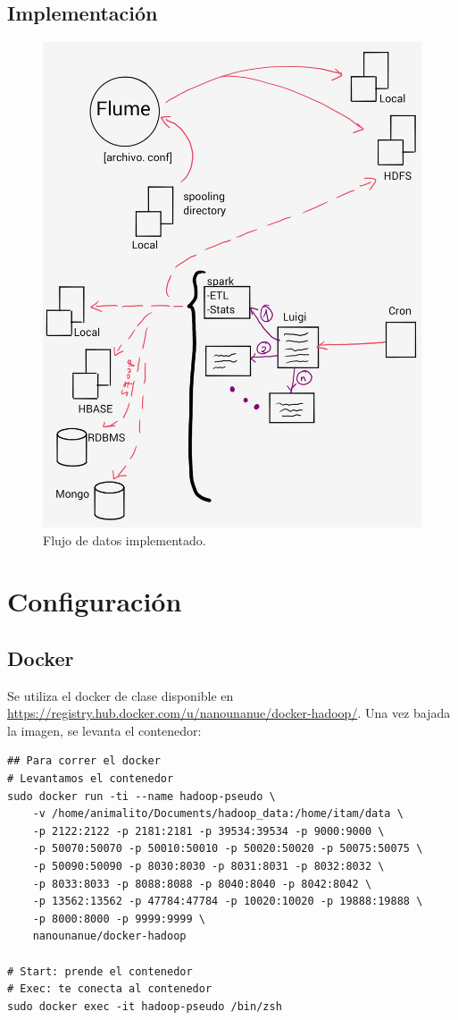 \documentclass[]{article}
\begin{document}
\subsection{Implementación}\label{implementacion}

\begin{figure}[H]
\centering
\includegraphics[width=0.8 \textwidth]{img/arquitectura.jpg}
\caption{Flujo de datos implementado.}
\end{figure}

\section{Configuración}\label{configuracion}

\subsection{Docker}\label{docker}

Se utiliza el docker de clase disponible en
\url{https://registry.hub.docker.com/u/nanounanue/docker-hadoop/}. Una
vez bajada la imagen, se levanta el contenedor:

\begin{verbatim}
## Para correr el docker
# Levantamos el contenedor
sudo docker run -ti --name hadoop-pseudo \
    -v /home/animalito/Documents/hadoop_data:/home/itam/data \
    -p 2122:2122 -p 2181:2181 -p 39534:39534 -p 9000:9000 \
    -p 50070:50070 -p 50010:50010 -p 50020:50020 -p 50075:50075 \
    -p 50090:50090 -p 8030:8030 -p 8031:8031 -p 8032:8032 \
    -p 8033:8033 -p 8088:8088 -p 8040:8040 -p 8042:8042 \
    -p 13562:13562 -p 47784:47784 -p 10020:10020 -p 19888:19888 \
    -p 8000:8000 -p 9999:9999 \
    nanounanue/docker-hadoop

# Start: prende el contenedor
# Exec: te conecta al contenedor
sudo docker exec -it hadoop-pseudo /bin/zsh
\end{verbatim}
\end{document}

